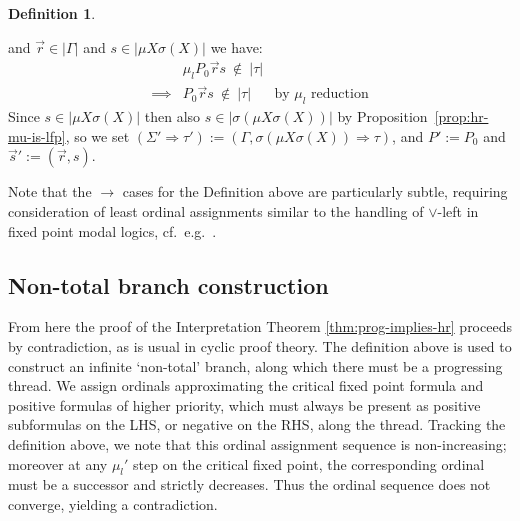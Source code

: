 \documentclass[10pt,a4paper]{amsart}
\theoremstyle{plain}
\theoremstyle{definition}
\newtheorem{definition}[definition]{Definition}
\newtheorem{remark}[remark]{Remark}
\newcommand{\dfn}{:=}
\newcommand{\anupam}[1]{\todo[color=green]{A: #1}}
\renewcommand{\todo}[1]{}
\renewcommand{\anupam}[1]{}
\theoremstyle{plain}
\theoremstyle{definition} %
\newcommand{\arrow}{\to}
\newcommand{\seqar}{\Rightarrow}
\newcommand{\mulunf}{\lr \mu'}
\newcommand{\lr}[1]{#1_l}
\renewcommand{\lor}{\vee}
\newcommand{\der}{P}
\newcommand{\hr}[1]{|#1|}
\begin{document}
\begin{definition}
\begin{itemize}
    \)
    and $\vec r \in \hr{\Gamma}$ and $s \in \hr{\mu X \sigma(X)}$ we have:
    \[
    \begin{array}{rll}
         &  \lr \mu\der_0 \vec r s \ \notin \ \hr\tau \\
        \implies & \der_0 \vec r s \ \notin\  \hr \tau  & \text{by $\lr \mu$ reduction}
    \end{array}
    \]
    Since $s \in \hr{\mu X \sigma(X)}$ then also $s \in \hr{\sigma(\mu X \sigma(X))}$ by Proposition~\ref{prop:hr-mu-is-lfp},
    so we set $(\Sigma' \seqar \tau') \dfn (\Gamma , \sigma(\mu X \sigma(X)) \seqar \tau)$, and $ \der' \dfn \der_0$ and $\vec s' \dfn (\vec r , s)$.
    \end{itemize}
\end{definition}

   Note that the $\arrow$ cases for the Definition above are particularly subtle, requiring consideration of least ordinal assignments similar to the handling of $\lor$-left in fixed point modal logics, cf.\ e.g.\ \cite{NiwWal96:games-for-mu-calc}.


\anupam{make a remark about extension to $+$ cases and first component}


\subsection{Non-total branch construction}
From here the proof of the Interpretation Theorem \ref{thm:prog-implies-hr} proceeds by contradiction, as is usual in cyclic proof theory.
The definition above is used to construct an infinite `non-total' branch, along which there must be a progressing thread.
We assign ordinals approximating the critical fixed point formula and positive formulas of higher priority, which must always be present as positive subformulas on the LHS, or negative on the RHS, along the thread.
Tracking the definition above, we note that this ordinal assignment sequence is non-increasing; moreover at any $\mulunf$ step on the critical fixed point, the corresponding ordinal must be a successor and strictly decreases. 
Thus the ordinal sequence does not converge, yielding a contradiction.





\anupam{commented remark about fixed points approximants below, pertinent to old proof, add similar remark back if time.}
\end{document}

